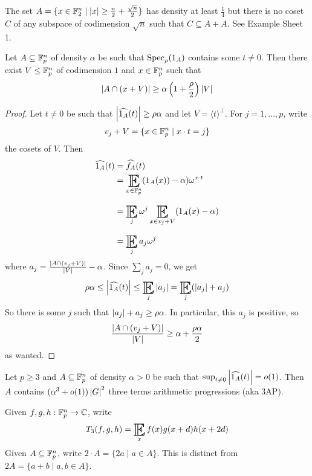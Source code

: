 \documentclass{article}
\begin{document}
\begin{eg}
  The set $A = \{x \in \mathbb F_2^n \mid \left\lvert x\right\rvert \ge \frac n2 + \frac{\sqrt n}2\}$ has density at least $\frac 14$ but there is no coset $C$ of any subspace of codimension $\sqrt n$ such that $C \subseteq A + A$. See Example Sheet 1.
\end{eg}

\begin{lem}\label{lem:density-increment}
  Let $A \subseteq \mathbb F_p^n$ of density $\alpha$ be such that $\operatorname{Spec}_\rho(1_A)$ contains some $t \ne 0$. Then there exist $V \le \mathbb F_p^n$ of codimension $1$ and $x \in \mathbb F_p^n$ such that
  $$\left\lvert A \cap (x + V)\right\rvert \ge \alpha\left(1 + \frac\rho 2\right)\left\lvert V\right\rvert$$
\end{lem}
\begin{proof}
  Let $t \ne 0$ be such that $\left\lvert \widehat{1_A}(t)\right\rvert \ge \rho\alpha$ and let $V = \langle t\rangle^\perp$. For $j = 1, \dots, p$, write
  $$v_j + V = \{x \in \mathbb F_p^n \mid x \cdot t = j\}$$
  the cosets of $V$. Then
  \begin{align*}
    \widehat{1_A}(t)
    & = \widehat{f_A}(t) \\
    & = \E_{x \in \F_p^n}(1_A(x)) - \alpha)\omega^{x \cdot t} \\
    & = \E_j \omega^j \E_{x \in v_j + V} (1_A(x) - \alpha) \\
    & = \E_j a_j \omega^j
  \end{align*}
  where $a_j = \frac{\left\lvert A \cap (v_j + V)\right\rvert}{\left\lvert V\right\rvert} - \alpha$. Since $\sum_j a_j = 0$, we get
  $$\rho\alpha \le \abs{\widehat{1_A}(t)} \le \E_j \abs{a_j} = \E_j (\abs{a_j} + a_j)$$
  So there is some $j$ such that $\left\lvert a_j\right\rvert + a_j \ge \rho\alpha$. In particular, this $a_j$ is positive, so
   $$\frac{\left\lvert A \cap (v_j + V)\right\rvert}{\left\lvert V\right\rvert} \ge \alpha + \frac{\rho\alpha}2$$
   as wanted.
\end{proof}

\newlec

\begin{lem}\label{lem:3AP-estimate}
  Let $p \ge 3$ and $A \subseteq \mathbb F_p^n$ of density $\alpha > 0$ be such that $\sup_{t \ne 0} \left\lvert \widehat{1_A}(t)\right\rvert = o(1)$. Then $A$ contains $(\alpha^3 + o(1))\left\lvert G\right\rvert^2$ three terms arithmetic progressions (aka 3AP).
\end{lem}

\begin{notation}
  Given $f, g, h : \mathbb F_p^n \to \mathbb C$, write
  $$T_3(f, g, h) = \E_x f(x) g(x + d) h(x + 2d)$$
  Given $A \subseteq \mathbb F_p^n$, write $2 \cdot A = \{2a \mid a \in A\}$. This is distinct from $2A = \{a + b \mid a, b \in A\}$.
\end{notation}
\end{document}
